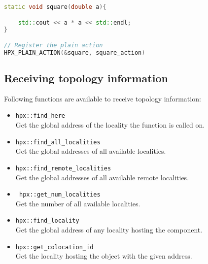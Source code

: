 \begin{lstlisting}[language=c++,caption={Plain actions in HPX.\label{code:hpx:action:plain}},float,floatplacement=htb]
static void square(double a){

	std::cout << a * a << std::endl;
}

// Register the plain action
HPX_PLAIN_ACTION(&square, square_action)
\end{lstlisting}

\subsection{Receiving topology information}
Following functions are available to receive topology information:
\begin{itemize}
\item \lstinline|hpx::find_here| \\
Get the global address of the locality the function is called on.

\item \lstinline|hpx::find_all_localities| \\
Get the global addresses of all available localities.

\item \lstinline|hpx::find_remote_localities| \\
Get the global addresses of all available remote localities.

\item \lstinline| hpx::get_num_localities| \\
Get the number of all available localities.

\item \lstinline|hpx::find_locality| \\
Get the global address of any locality hosting the component.

\item \lstinline|hpx::get_colocation_id| \\
Get the locality hosting the object with the given address.
\end{itemize}


